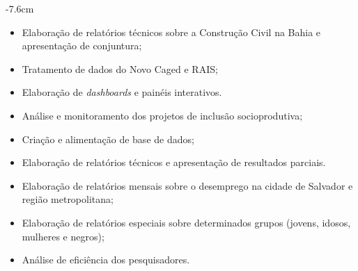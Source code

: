 \documentclass[10pt,a4paper]{cv}
\begin{document}
\tagline{}

\begin{adjustwidth}{}{-7.6cm}
\makecvheader
\end{adjustwidth}




\begin{itemize}
\item Elaboração de relatórios técnicos sobre a Construção Civil na Bahia e apresentação de conjuntura;
\item Tratamento de dados do Novo Caged e RAIS;
\item Elaboração de \textit{dashboards} e painéis interativos.
\end{itemize}

\divider

\begin{itemize}
\item Análise e monitoramento dos projetos de inclusão socioprodutiva;
\item Criação e alimentação de base de dados;
\item Elaboração de relatórios técnicos e apresentação de resultados parciais.
\end{itemize}

\divider

\begin{itemize}
	\item Elaboração de relatórios mensais sobre o desemprego na cidade de Salvador e região metropolitana;
	\item Elaboração de relatórios especiais sobre determinados grupos  (jovens, idosos, mulheres e negros);
	\item Análise de eficiência dos pesquisadores.
\end{itemize}
\end{document}
